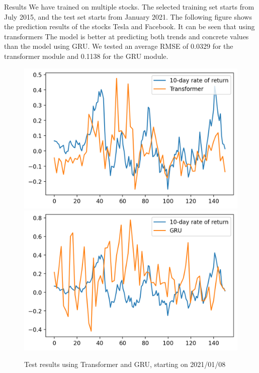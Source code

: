\documentclass[final]{beamer}
\newlength{\colwidth}
\begin{document}
\begin{frame}[t]
\begin{columns}[t]
\begin{column}{\colwidth}
  \begin{exampleblock}{Results}
    We have trained on multiple stocks. The selected training set starts from July 2015, and the test set starts from January 2021. The following figure shows the prediction results of the stocks Tesla and Facebook. It can be seen that using transformers The model is better at predicting both trends and concrete values than the model using GRU. We tested an average RMSE of 0.0329 for the transformer module and 0.1138 for the GRU module.
    \begin{figure}
  \centering
  \includegraphics[scale=1]{out1.png}
  \hspace{1in}
  \includegraphics[scale=1]{outg.png}
  \caption{Test results using Transformer and GRU, starting on 2021/01/08}
\end{figure}
    \begin{figure}
  \centering

\end{figure}
\end{exampleblock}
\end{column}
\end{columns}
\end{frame}
\end{document}
